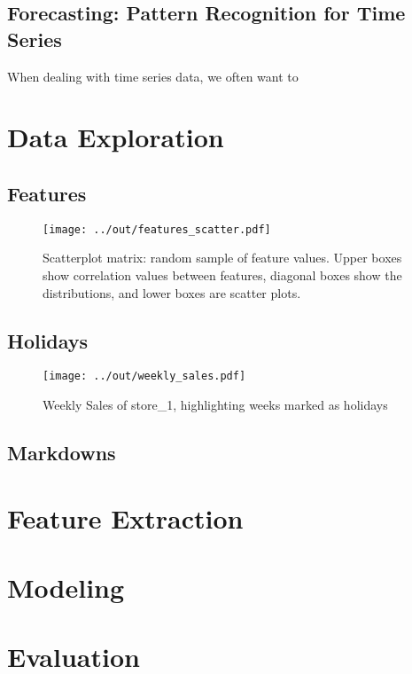 \documentclass{article}
\begin{document}
\subsection{Forecasting: Pattern Recognition for Time Series}
When dealing with time series data, we often want to 


\section{Data Exploration}

\subsection{Features}

\begin{figure}[H]
    \centering
    \captionsetup{width=.6\textwidth}
    \texttt{[image: ../out/features\_scatter.pdf]}
    \caption{Scatterplot matrix: random sample of feature values. Upper boxes show correlation values between features, diagonal boxes show the distributions, and lower boxes are scatter plots.}
    \label{weekly_sales}
\end{figure}


\subsection{Holidays}

\begin{figure}[H]
    \centering
    \captionsetup{width=.6\textwidth}
    \texttt{[image: ../out/weekly\_sales.pdf]}
    \caption{Weekly Sales of store\_1, highlighting weeks marked as holidays}
    \label{weekly_sales}
\end{figure}

\subsection{Markdowns}

\section{Feature Extraction}

\section{Modeling}

\section{Evaluation}
\end{document}
